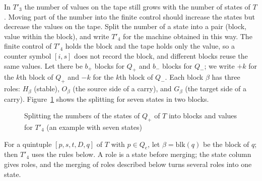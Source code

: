 \documentclass{article}
\theoremstyle{definition}
\theoremstyle{remark}
\begin{document}
In $T'_3$ the number of values on the tape still grows with the number of states of $T$. Moving part of the number into the finite control should increase the states but decrease the values on the tape.
Split the number of a state into a pair (block, value within the block), and write $T'_4$ for the machine obtained in this way.
The finite control of $T'_4$ holds the block and the tape holds only the value, so a counter symbol $[i,s]$ does not record the block, and different blocks reuse the same values.
Let there be $b_+$ blocks for $Q_+$ and $b_-$ blocks for $Q_-$; we write $+k$ for the $k$th block of $Q_+$ and $-k$ for the $k$th block of $Q_-$.
Each block $\beta$ has three roles: $H_\beta$ (stable), $O_\beta$ (the source side of a carry), and $G_\beta$ (the target side of a carry).
Figure~\ref{fig:blocks} shows the splitting for seven states in two blocks.
\begin{figure}[tb]
\centering
{}
\caption{Splitting the numbers of the states of $Q_+$ of $T$ into blocks and values for $T'_4$ (an example with seven states)}
\label{fig:blocks}
\end{figure}
For a quintuple $[p,s,t,D,q]$ of $T$ with $p\in Q_e$, let $\beta=\mathrm{blk}(q)$ be the block of $q$; then $T'_4$ uses the rules below. A role is a state before merging; the state column gives roles, and the merging of roles described below turns several roles into one state.
\end{document}
